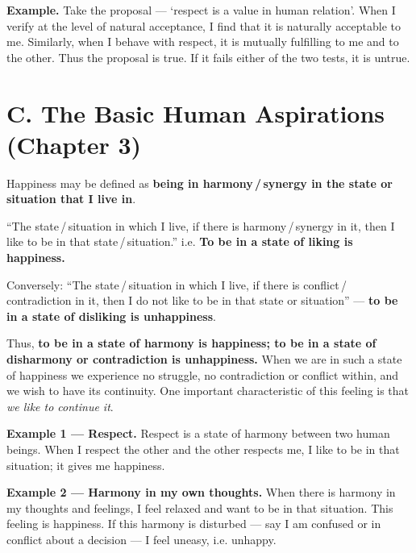 \textbf{Example.} Take the proposal --- `respect is a value in human
relation'. When I verify at the level of natural acceptance, I find that it is
naturally acceptable to me. Similarly, when I behave with respect, it is
mutually fulfilling to me and to the other. Thus the proposal is true. If it
fails either of the two tests, it is untrue.

\section{C. The Basic Human Aspirations (Chapter 3)}


\ans Happiness may be defined as \textbf{being in harmony\,/\,synergy in the
state or situation that I live in}.

\begin{keybox}
``The state\,/\,situation in which I live, if there is harmony\,/\,synergy in
it, then I like to be in that state\,/\,situation.'' \quad i.e. \quad
\textbf{To be in a state of liking is happiness.}

\vspace{3pt}
Conversely: ``The state\,/\,situation in which I live, if there is
conflict\,/\,contradiction in it, then I do not like to be in that state or
situation'' --- \textbf{to be in a state of disliking is unhappiness}.
\end{keybox}

Thus, \textbf{to be in a state of harmony is happiness; to be in a state of
disharmony or contradiction is unhappiness.} When we are in such a state of
happiness we experience no struggle, no contradiction or conflict within, and
we wish to have its continuity. One important characteristic of this feeling
is that \emph{we like to continue it}.

\textbf{Example 1 --- Respect.} Respect is a state of harmony between two
human beings. When I respect the other and the other respects me, I like to be
in that situation; it gives me happiness.

\textbf{Example 2 --- Harmony in my own thoughts.} When there is harmony in my
thoughts and feelings, I feel relaxed and want to be in that situation. This
feeling is happiness. If this harmony is disturbed --- say I am confused or in
conflict about a decision --- I feel uneasy, i.e. unhappy.

